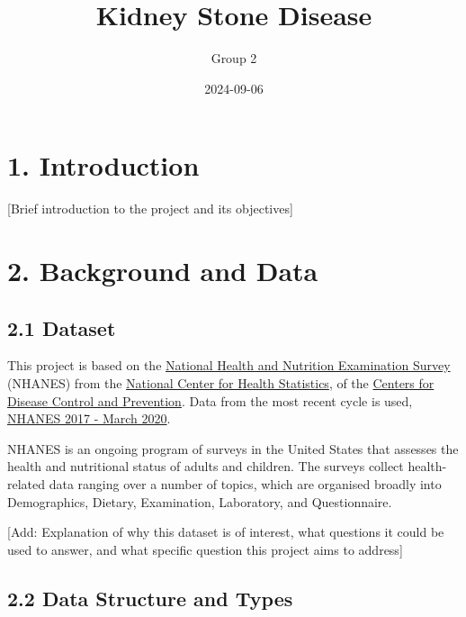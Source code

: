 \documentclass[
]{article}
\title{Kidney Stone Disease}
\author{Group 2}
\date{2024-09-06}
\begin{document}
\maketitle

{
\setcounter{tocdepth}{2}
\tableofcontents
}
\newpage

\hypertarget{introduction}{%
\section{1. Introduction}\label{introduction}}

{[}Brief introduction to the project and its objectives{]}

\hypertarget{background-and-data}{%
\section{2. Background and Data}\label{background-and-data}}

\hypertarget{dataset}{%
\subsection{2.1 Dataset}\label{dataset}}

This project is based on the
\href{https://www.cdc.gov/nchs/nhanes/index.htm}{National Health and
Nutrition Examination Survey} (NHANES) from the
\href{https://www.cdc.gov/nchs/index.htm}{National Center for Health
Statistics}, of the \href{https://www.cdc.gov/}{Centers for Disease
Control and Prevention}. Data from the most recent cycle is used,
\href{https://wwwn.cdc.gov/nchs/nhanes/continuousnhanes/default.aspx?Cycle=2017-2020}{NHANES
2017 - March 2020}.

NHANES is an ongoing program of surveys in the United States that
assesses the health and nutritional status of adults and children. The
surveys collect health-related data ranging over a number of topics,
which are organised broadly into Demographics, Dietary, Examination,
Laboratory, and Questionnaire.

{[}Add: Explanation of why this dataset is of interest, what questions
it could be used to answer, and what specific question this project aims
to address{]}

\hypertarget{data-structure-and-types}{%
\subsection{2.2 Data Structure and
Types}\label{data-structure-and-types}}
\end{document}
